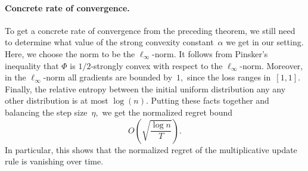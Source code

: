 \paragraph{Concrete rate of convergence.}
To get a concrete rate of convergence from the preceding theorem,
we still need to determine what value of the strong convexity
constant~$\alpha$ we get in our setting. Here, we choose the norm to be the
$\ell_\infty$-norm. It follows from Pinsker's inequality
that $\Phi$ is $1/2$-strongly convex with respect to the $\ell_\infty$-norm.
Moreover, in the $\ell_\infty$-norm all gradients are bounded by~$1,$ since the
loss ranges in~$[1,1].$ Finally, the relative entropy between the initial
uniform distribution any any other distribution is at most $\log(n).$ Putting
these facts together and balancing the step size~$\eta,$ we get the normalized 
regret bound
\[
O\left(\sqrt{\frac{\log n}{T}}\right).
\]
In particular, this shows that the normalized regret of the multiplicative
update rule is vanishing over time.
